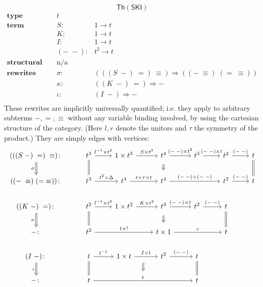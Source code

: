\documentclass{amsart}
\theoremstyle{definition}
\newcommand{\Th}{\mathsf{Th}}
\newcommand{\maps}{\colon}
\begin{document}
\newpage
\[  \Th(\mathsf{SKI})\]
\[\begin{array}{lrl}
\textbf{type} & t &\\
\textbf{term constructors} & S\maps & 1 \to t\\
& K\maps & 1 \to t\\
& I\maps & 1 \to t\\
& (-\; -)\maps &  t^2 \to t\\
\textbf{structural congruence} & \text{n/a} &\\
\textbf{rewrites} & \sigma\maps & (((S\; -)\; =)\; \equiv) \Rightarrow ((-\; \equiv)\; (=\; \equiv))\\
& \kappa\maps & ((K\; -)\; =) \Rightarrow -\\
& \iota\maps & (I\; -) \Rightarrow -\\
\end{array}\]
These rewrites are implicitly universally quantified; i.e. they apply to arbitrary subterms $-, =, \equiv$ without any variable binding involved, by using the cartesian structure of the category. (Here $l,r$ denote the unitors and $\tau$ the symmetry of the product.) They are simply edges with vertices:
\[\begin{tikzcd}
(((S\; -)\; =)\; \equiv)\maps \arrow[Rightarrow,d,swap,"\sigma"] & t^3 \arrow[d,equal] \arrow[r,"l^{-1} \times t^3"] & 1\times t^3 \arrow[r,"S \times t^3"] & t^4 \arrow[Rightarrow,d,shorten >=0.2cm,shorten <=0.2cm] \arrow[r,"(-\;-)\times t^2"] & t^3 \arrow[r,"(-\;-) \times t"] & t^2 \arrow[r,"(-\;-)"] & t\arrow[d,equal]\\
((-\; \equiv)\; (=\; \equiv))\maps & t^3 \arrow[r,"t^2 \times \Delta"] & t^4 \arrow[r,"t \times \tau \times t"]& t^4 \arrow[rr,"(-\;-) \times (-\;-)"]&& t^2 \arrow[r,"(-\;-)"]& t\\
((K\; -)\; =)\maps \arrow[Rightarrow,d,swap,"\kappa"] & t^2 \arrow[d,equal] \arrow[r,"l^{-1} \times t^2"] & 1\times t^2 \arrow[r,"K \times t^2"] & t^3 \arrow[Rightarrow,d,shorten >=0.2cm,shorten <=0.2cm] \arrow[r,"(-\;-)\times t"] & t^2 \arrow[r,"(-\;-)"] & t \arrow[d,equal]\\
-\maps & t^2 \arrow[rr,"t \times !"] && t \times 1 \arrow[rr,"r"] && t\\
(I\; -)\maps \arrow[Rightarrow,d,swap,"\iota"] & t \arrow[d,equal] \arrow[r,"l^{-1}"] & 1\times t \arrow[r,"I \times t",""name=1] & t^2 \arrow[r,"(-\;-)"] & t \arrow[d,equal]\\
-\maps & t \arrow[rrr,"t",""name=2] \arrow[Rightarrow,from=1,to=2,start anchor={[xshift=-0.8ex]},shorten >=0.3cm,shorten <=0.3cm] &&& t
\end{tikzcd}\]
\end{document}
